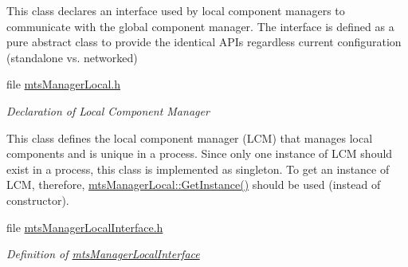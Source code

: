 \begin{DoxyCompactItemize}
\begin{DoxyCompactList}
This class declares an interface used by local component managers to communicate with the global component manager. The interface is defined as a pure abstract class to provide the identical A\+P\+Is regardless current configuration (standalone vs. networked) \end{DoxyCompactList}\item 
file \hyperlink{mts_manager_local_8h}{mts\+Manager\+Local.\+h}
\begin{DoxyCompactList}\small\item\em Declaration of Local Component Manager

This class defines the local component manager (L\+C\+M) that manages local components and is unique in a process. Since only one instance of L\+C\+M should exist in a process, this class is implemented as singleton. To get an instance of L\+C\+M, therefore, \hyperlink{classmts_manager_local_a025cb3746e1e69b07723066b562ac5cd}{mts\+Manager\+Local\+::\+Get\+Instance()} should be used (instead of constructor). \end{DoxyCompactList}\item 
file \hyperlink{mts_manager_local_interface_8h}{mts\+Manager\+Local\+Interface.\+h}
\begin{DoxyCompactList}\small\item\em Definition of \hyperlink{classmts_manager_local_interface}{mts\+Manager\+Local\+Interface}


\end{DoxyCompactList}
\end{DoxyCompactItemize}
